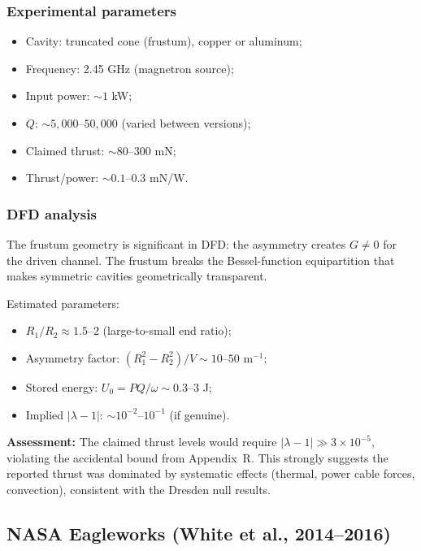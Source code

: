\documentclass[12pt,letterpaper]{article}
\begin{document}
\subsubsection{Experimental parameters}
\begin{itemize}[noitemsep]
  \item Cavity: truncated cone (frustum), copper or aluminum;
  \item Frequency: 2.45 GHz (magnetron source);
  \item Input power: $\sim 1$ kW;
  \item $Q$: $\sim 5{,}000$--$50{,}000$ (varied between versions);
  \item Claimed thrust: $\sim 80$--$300$ mN;
  \item Thrust/power: $\sim 0.1$--$0.3$ mN/W.
\end{itemize}

\subsubsection{DFD analysis}

The frustum geometry is significant in DFD: the asymmetry creates
$G \neq 0$ for the driven channel.  The frustum breaks the
Bessel-function equipartition that makes symmetric cavities
geometrically transparent.

Estimated parameters:
\begin{itemize}[noitemsep]
  \item $R_1/R_2 \approx 1.5$--$2$ (large-to-small end ratio);
  \item Asymmetry factor: $(R_1^2 - R_2^2)/V \sim 10$--$50$ m$^{-1}$;
  \item Stored energy: $U_0 = PQ/\omega \sim 0.3$--$3$ J;
  \item Implied $|\lambda - 1|$: $\sim 10^{-2}$--$10^{-1}$ (if genuine).
\end{itemize}

\textbf{Assessment:} The claimed thrust levels would require
$|\lambda - 1| \gg 3\times 10^{-5}$, violating the accidental bound
from Appendix~R.  This strongly suggests the reported thrust was
dominated by systematic effects (thermal, power cable forces,
convection), consistent with the Dresden null results.

\subsection{NASA Eagleworks (White et al., 2014--2016)}
\end{document}
